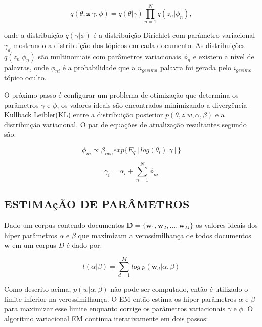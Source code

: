 \documentclass[12pt,a4paper]{article}
\begin{document}
  \begin{equation}
  q(\theta,\textbf{z}|\gamma,\phi)=q(\theta|\gamma)\prod_{n=1}^{N}q(z_n|\phi_n), 
  \end{equation}
  
  onde a distribuição  $q(\gamma|\phi)$ é a distribuição Dirichlet com parâmetro variacional $\gamma_d$ mostrando a distribuição dos tópicos em cada documento. As distribuições $q(z_n | \phi_n)$ são multinomiais com parâmetros variacionais $\phi_n$ e existem a nível de palavras, onde $\phi_{ni}$ é a probabilidade que a $n_{gesima}$ palavra foi gerada pelo $i_{gesimo}$ tópico oculto.
  
  O próximo passo é configurar um problema de otimização que determina os parâmetros $\gamma$ e $\phi$, os valores ideais são encontrados minimizando a divergência Kullback Leibler(KL) entre a distribuição posterior $p(\theta, z|w,\alpha,\beta)$ e a distribuição variacional. O par de equações de atualização resultantes segundo  são:
  
  \begin{equation}
  \phi_{ni} \propto \beta_{iwn} exp\{E_q[log(\theta_i)|\gamma]\}
  \end{equation}
  
  \begin{equation}
  \gamma_i = \alpha_i + \sum_{n=1}^{N} \phi_{ni}
  \end{equation}
  
  
  \subsection{ESTIMAçÃO DE PARÂMETROS}
  Dado um corpus contendo documentos $\textbf{D} = \{\textbf{w}_1, \textbf{w}_2, . . ., \textbf{w}_M\}$ os valores ideais dos hiper parâmetros $\alpha$ e $\beta$ que maximizam a verossimilhança de todos documentos $\textbf{w}$ em um corpus $D$ é dado por:
  
  \begin{equation}
  l(\alpha|\beta) = \sum_{d=1}^{M} log\ p(\textbf{w}_d|\alpha,\beta)
  \end{equation}
  
  Como descrito acima, $p(w|\alpha,\beta)$ não pode ser computado, então é utilizado o limite inferior na verossimilhança. O EM então estima os hiper parâmetros $\alpha$ e $\beta$ para maximizar esse limite enquanto corrige os parâmetros variacionais $\gamma$ e $\phi$. O algoritmo variacional EM continua iterativamente em dois passos:
  
\end{document}
